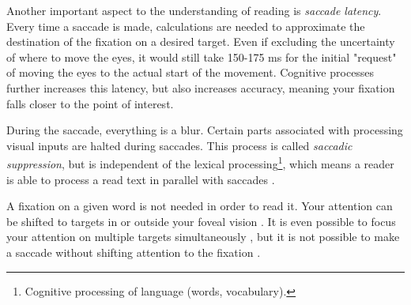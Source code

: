 Another important aspect to the understanding of reading is \textit{saccade latency}. Every time a saccade is made, calculations are needed to approximate the destination of the fixation on a desired target. Even if excluding the uncertainty of where to move the eyes, it would still take 150-175 ms for the initial "request" of moving the eyes to the actual start of the movement. Cognitive processes further increases this latency, but also increases accuracy, meaning your fixation falls closer to the point of interest.


During the saccade, everything is a blur. Certain parts associated with processing visual inputs are halted during saccades. This process is called \textit{saccadic suppression}, but is independent of the lexical processing\footnote{Cognitive processing of language (words, vocabulary).}, which means a reader is able to process a read text in parallel with saccades \cite{eyeMovement}.

A fixation on a given word is not needed in order to read it. Your attention can be shifted to targets in or outside your foveal vision \cite{eyeMovement}. It is even possible to focus your attention on multiple targets simultaneously \cite{simAttention}, but it is not possible to make a saccade without shifting attention to the fixation \cite{eyeMovement}.